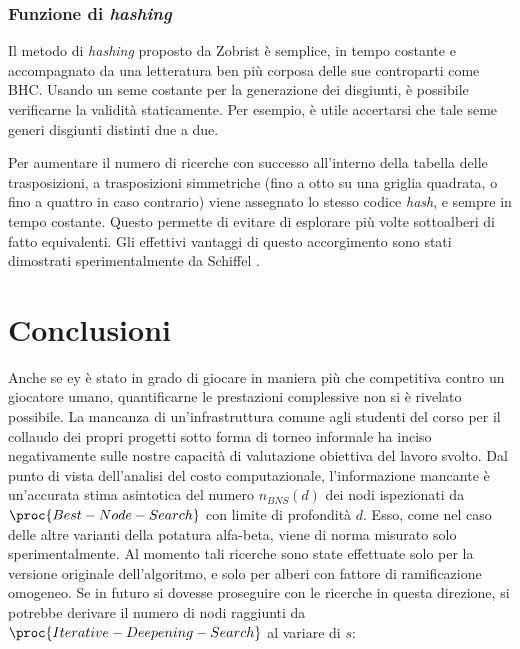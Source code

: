 \documentclass{article}
\begin{document}
\subsubsection{Funzione di \emph{hashing}}

Il metodo di \emph{hashing} proposto da Zobrist
\cite{edsoai.ocn79990521120120101} è semplice, in tempo costante e accompagnato
da una letteratura ben più corposa delle sue controparti come BHC. Usando un
seme costante per la generazione dei disgiunti, è possibile verificarne la
validità staticamente. Per esempio, è utile accertarsi che tale seme generi
disgiunti distinti due a due.

Per aumentare il numero di ricerche con successo all'interno della tabella delle
trasposizioni, a trasposizioni simmetriche (fino a otto su una griglia quadrata,
o fino a quattro in caso contrario) viene assegnato lo stesso codice
\emph{hash}, e sempre in tempo costante. Questo permette di evitare di esplorare
più volte sottoalberi di fatto equivalenti. Gli effettivi vantaggi di questo
accorgimento sono stati dimostrati sperimentalmente da Schiffel \cite{schiffel}.

\section{Conclusioni}

Anche se {
    ey
} è stato in grado di giocare in maniera più che competitiva contro un giocatore
umano, quantificarne le prestazioni complessive non si è rivelato possibile. La
mancanza di un'infrastruttura comune agli studenti del corso per il collaudo dei
propri progetti sotto forma di torneo informale ha inciso negativamente sulle
nostre capacità di valutazione obiettiva del lavoro svolto. Dal punto di vista
dell'analisi del costo computazionale, l'informazione mancante è un'accurata
stima asintotica del numero $n_{BNS}(d)$ dei nodi ispezionati da
$\proc{Best-Node-Search}$ con limite di profondità $d$. Esso, come nel caso
delle altre varianti della potatura alfa-beta, viene di norma misurato solo
sperimentalmente. Al momento tali ricerche sono state effettuate solo per la
versione originale dell'algoritmo, e solo per alberi con fattore di
ramificazione omogeneo. Se in futuro si dovesse proseguire con le ricerche in
questa direzione, si potrebbe derivare il numero di nodi raggiunti da
$\proc{Iterative-Deepening-Search}$ al variare di $s$:
\end{document}
